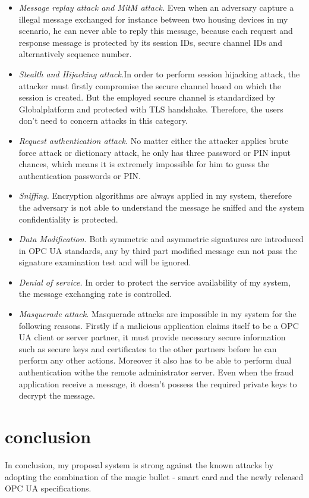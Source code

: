 \begin{itemize}
\item \emph{Message replay attack and MitM attack.} Even when an adversary capture a illegal message  exchanged for instance between two housing devices in my scenario, he can never able to reply this message, because each request and response message is protected by its  session IDs, secure channel IDs and alternatively sequence number.
\item \emph{Stealth and Hijacking attack.}In order to perform session hijacking attack, the attacker must firstly compromise the secure channel based on which the session is created. But the employed secure  channel is standardized by Globalplatform and protected with TLS handshake. Therefore, the users don't need to concern attacks in this category.
\item \emph{Request authentication attack.} No matter either the attacker applies brute force attack  or dictionary attack, he only has three password or PIN input chances, which means it is extremely impossible for him to guess the authentication passwords or PIN.
\item \emph{Sniffing.} Encryption algorithms are always  applied in my system, therefore the adversary is not  able to understand  the message he sniffed and the system confidentiality is protected.
\item \emph{Data Modification.} Both  symmetric and asymmetric  signatures are introduced in OPC UA standards, any by third part modified message can not pass the signature examination test and will be ignored.
\item \emph{Denial of service.} In order to protect  the service availability of my system, the message  exchanging rate is controlled. 
\item \emph{Masquerade attack.} Masquerade attacks are impossible in my system for the following reasons. Firstly if a malicious application claims itself to be a OPC UA client or server partner, it must provide necessary secure information such as secure keys and certificates to the other partners before he can perform any other actions. Moreover it also has to be able to perform dual authentication withe the remote administrator server. Even when the fraud application receive a message, it doesn't possess the required  private keys to decrypt the message. 
\end{itemize}

\section{conclusion}
In conclusion, my proposal  system is strong against  the known attacks by adopting the combination of the magic bullet - smart card and the newly released OPC UA specifications. 
